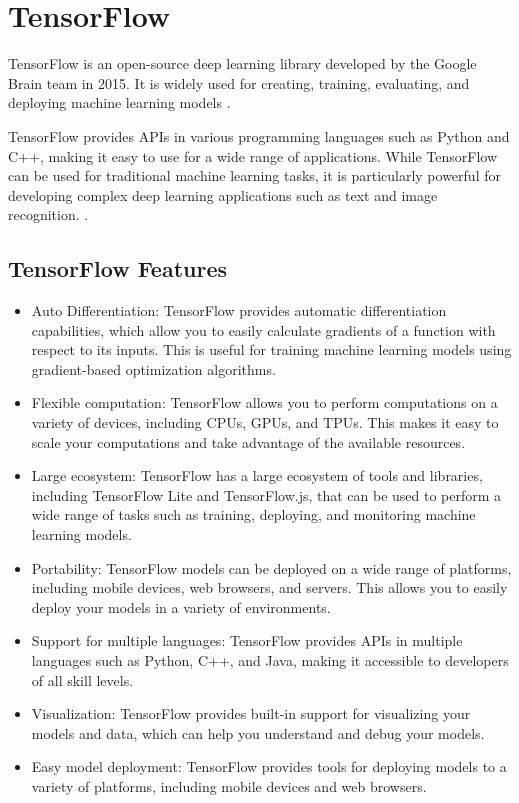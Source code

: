 \section{TensorFlow}

TensorFlow is an open-source deep learning library developed by the Google Brain team in 2015. It is widely used for creating, training, evaluating, and deploying machine learning models \cite{Warden:2020} . 

TensorFlow provides APIs in various programming languages such as Python and C++, making it easy to use for a wide range of applications. While TensorFlow can be used for traditional machine learning tasks, it is particularly powerful for developing complex deep learning applications such as text and image recognition.  \cite{Rajendra:2021} . 

\subsection{TensorFlow Features}
\begin{itemize}
	\item Auto Differentiation: TensorFlow provides automatic differentiation capabilities, which allow you to easily calculate gradients of a function with respect to its inputs. This is useful for training machine learning models using gradient-based optimization algorithms.
	\item Flexible computation: TensorFlow allows you to perform computations on a variety of devices, including CPUs, GPUs, and TPUs. This makes it easy to scale your computations and take advantage of the available resources.
	\item Large ecosystem: TensorFlow has a large ecosystem of tools and libraries, including TensorFlow Lite and TensorFlow.js, that can be used to perform a wide range of tasks such as training, deploying, and monitoring machine learning models.
	\item Portability: TensorFlow models can be deployed on a wide range of platforms, including mobile devices, web browsers, and servers. This allows you to easily deploy your models in a variety of environments.
	\item Support for multiple languages: TensorFlow provides APIs in multiple languages such as Python, C++, and Java, making it accessible to developers of all skill levels.
	\item Visualization: TensorFlow provides built-in support for visualizing your models and data, which can help you understand and debug your models.
	\item Easy model deployment: TensorFlow provides tools for deploying models to a variety of platforms, including mobile devices and web browsers.
\end{itemize}

